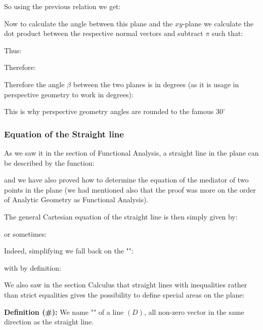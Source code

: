 	So using the previous relation we get:
	
	Now to calculate the angle between this plane and the $xy$-plane we calculate the dot product between the respective normal vectors and subtract $\pi$ such that:
	
	Thus:
	
	 Therefore:
	
	 Therefore the angle $\beta$ between the two planes is in degrees (as it is usage in perspective geometry to work in degrees):
	 
	 This is why perspective geometry angles are rounded to the famous $30^\circ$
	
	\pagebreak	
	\subsubsection{Equation of the Straight line}\label{equation of the straight line}
	As we saw it in the section of Functional Analysis, a straight line in the plane can be described by the function:
	
	and we have also proved how to determine the equation of the mediator of two points in the plane (we had mentioned also that the proof was more on the order of Analytic Geometry as Functional Analysis).
	
	The general Cartesian equation of the straight line is then simply given by:
	
	or sometimes:
	
	Indeed, simplifying we fall back on the "":
	
	with by definition:
	
	We also saw in the section Calculus that straight lines with inequalities rather than strict equalities gives the possibility to define special areas on the plane:
	\begin{center}
	\end{center}
	\textbf{Definition (\#\mydef):} We name "" of a line $(D)$, all non-zero vector in the same direction as the straight line.
	
